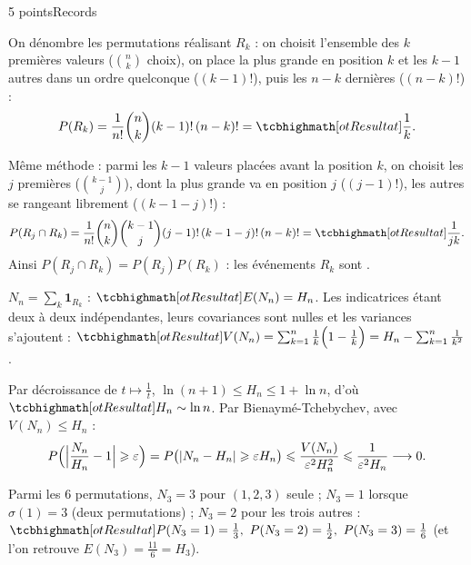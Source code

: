 \begin{corrigeEval}{5 points}{Records}
\begin{questions}
  \item On dénombre les permutations réalisant $R_k$ : on choisit
    l'ensemble des $k$ premières valeurs ($\binom nk$ choix), on place la
    plus grande en position $k$ et les $k-1$ autres dans un ordre
    quelconque ($(k-1)!$), puis les $n-k$ dernières ($(n-k)!$) :
    \[P(R_k)=\frac{1}{n!}\binom nk(k-1)!\,(n-k)!=\res{\frac1k}.\]
    \pts{1 pt}
  \item Même méthode : parmi les $k-1$ valeurs placées avant la position
    $k$, on choisit les $j$ premières ($\binom{k-1}{j}$), dont la plus
    grande va en position $j$ ($(j-1)!$), les autres se rangeant librement
    ($(k-1-j)!$) :
    \[P(R_j\cap R_k)=\frac{1}{n!}\binom nk\binom{k-1}{j}(j-1)!\,(k-1-j)!\,(n-k)!=\res{\frac{1}{jk}}.\]
    Ainsi $P(R_j\cap R_k)=P(R_j)P(R_k)$ : les événements $R_k$ sont
    . 
  \item $N_n=\sum_k\mathbf{1}_{R_k}$ : $\res{E(N_n)=H_n}$. Les indicatrices
    étant deux à deux indépendantes, leurs covariances sont nulles et les
    variances s'ajoutent :
    $\res{V(N_n)=\sum_{k=1}^{n}\frac1k\Bigl(1-\frac1k\Bigr)=H_n-\sum_{k=1}^{n}\frac{1}{k^{2}}}$.
    \pts{1 pt}
  \item Par décroissance de $t\mapsto\frac1t$,
    $\ln(n+1)\leqslant H_n\leqslant1+\ln n$, d'où $\res{H_n\sim\ln n}$. Par
    Bienaymé-Tchebychev, avec $V(N_n)\leqslant H_n$ :
    \[P\Bigl(\Bigl|\frac{N_n}{H_n}-1\Bigr|\geqslant\varepsilon\Bigr)
      =P\bigl(|N_n-H_n|\geqslant\varepsilon H_n\bigr)\leqslant\frac{V(N_n)}{\varepsilon^{2}H_n^{2}}
      \leqslant\frac{1}{\varepsilon^{2}H_n}\longrightarrow0.\]
    \pts{1 pt}
  \item Parmi les $6$ permutations, $N_3=3$ pour $(1,2,3)$ seule ;
    $N_3=1$ lorsque $\sigma(1)=3$ (deux permutations) ; $N_3=2$ pour les
    trois autres :
    $\res{P(N_3=1)=\frac13,\ P(N_3=2)=\frac12,\ P(N_3=3)=\frac16}$ (et l'on
    retrouve $E(N_3)=\frac{11}{6}=H_3$). 
\end{questions}
\begin{center}\begin{minipage}{\linewidth}\centering
{}
\end{minipage}
\end{center}
\end{corrigeEval}

